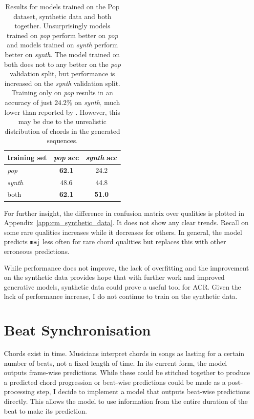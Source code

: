 \begin{table}[h]
    \centering
    \begin{tabular}{lcc}
        \toprule
        training set & \emph{pop} acc & \emph{synth} acc \\  
        \midrule
        \emph{pop} & \textbf{62.1} & 24.2 \\
        \emph{synth} & 48.6 & 44.8 \\
        both & \textbf{62.1} & \textbf{51.0} \\
        \bottomrule
    \end{tabular}
    \caption{Results for models trained on the Pop dataset, synthetic data and both together. Unsurprisingly models trained on \emph{pop} perform better on \emph{pop} and models trained on \emph{synth} perform better on \emph{synth}. The model trained on both does not to any better on the \emph{pop} validation split, but performance is increased on the \emph{synth} validation split. Training only on \emph{pop} results in an accuracy of just $24.2\%$ on \emph{synth}, much lower than reported by \citet{MusiConGen}. However, this may be due to the unrealistic distribution of chords in the generated sequences. }\label{tab:synthetic_data}
\end{table}

For further insight, the difference in confusion matrix over qualities is plotted in Appendix~\ref{app:cm_synthetic_data}. It does not show any clear trends. Recall on some rare qualities increases while it decreases for others. In general, the model predicts \texttt{maj} less often for rare chord qualities but replaces this with other erroneous predictions. 

While performance does not improve, the lack of overfitting and the improvement on the synthetic data provides hope that with further work and improved generative models, synthetic data could prove a useful tool for ACR. Given the lack of performance increase, I do not continue to train on the synthetic data.

\section{Beat Synchronisation}\label{sec:beat-synchronisation}

Chords exist in time. Musicians interpret chords in songs as lasting for a certain number of beats, not a fixed length of time. In its current form, the model outputs frame-wise predictions. While these could be stitched together to produce a predicted chord progression or beat-wise predictions could be made as a post-processing step, I decide to implement a model that outputs beat-wise predictions directly. This allows the model to use information from the entire duration of the beat to make its prediction.

